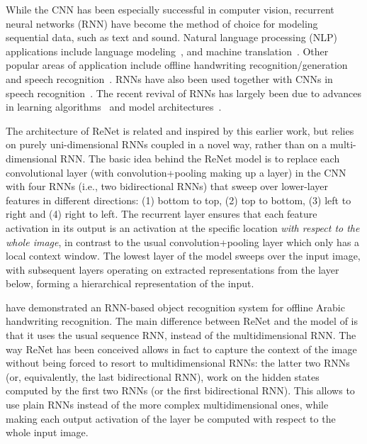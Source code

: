 While the CNN has been especially successful in computer vision, recurrent
neural networks (RNN) have become the method of choice for modeling sequential
data, such as text and sound. Natural language processing (NLP) applications
include language modeling~\citep[see, e.g.,][]{Mikolov-thesis-2012}, and
machine translation~\citep{Sutskever-et-al-NIPS2014,Cho2014,
bahdanau2014neural}. Other popular areas of application include offline
handwriting recognition/generation~\citep{Graves+Schmidhuber-2009,
Graves-et-al-NIPS2007,Graves-arxiv2013} and speech recognition~\citep{
Chorowski-et-al-arxiv2014,Graves+Jaitly-ICML2014}. RNNs have also been used
together with CNNs in speech recognition~\citep{sainath2015}. The recent
revival of RNNs has largely been due to advances in learning
algorithms~\citep{Pascanu+al-ICML2013-small,Martens+Sutskever-ICML2011} and
model architectures~\citep{Pascanu-et-al-ICLR2014,Cho2014}.

The architecture of ReNet is related and inspired by this earlier work, but
relies on purely uni-dimensional RNNs coupled in a novel way, rather than on a
multi-dimensional RNN. The basic idea behind the ReNet model is to replace each
convolutional layer (with convolution+pooling making up a layer) in the CNN
with four RNNs (i.e., two bidirectional RNNs) that sweep over lower-layer
features in different directions: (1) bottom to top, (2) top to bottom, (3)
left to right and (4) right to left.  The recurrent layer ensures that each
feature activation in its output is an activation at the specific location
\emph{with respect to the whole image}, in contrast to the usual
convolution+pooling layer which only has a local context window. The lowest
layer of the model sweeps over the input image, with subsequent layers
operating on extracted representations from the layer below, forming a
hierarchical representation of the input.

\citet{Graves+Schmidhuber-2009} have demonstrated an RNN-based object
recognition system for offline Arabic handwriting recognition. The main
difference between ReNet and the model of \citet{Graves+Schmidhuber-2009} is
that it uses the usual sequence RNN, instead of the multidimensional RNN. The
way ReNet has been conceived allows in fact to capture the context of the
image without being forced to resort to multidimensional RNNs: the latter two
RNNs (or, equivalently, the last bidirectional RNN), work on the hidden states
computed by the first two RNNs (or the first bidirectional RNN). This allows
to use plain RNNs instead of the more complex multidimensional ones, while
making each output activation of the layer be computed with respect to the
whole input image.

